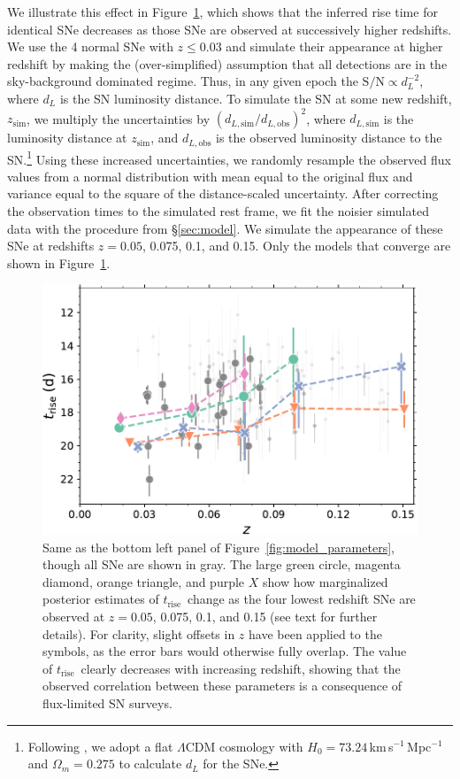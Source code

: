 \documentclass[twocolumn]{./aastex63}
\newcommand{\trise}{$t_\mathrm{rise}$}
\begin{document}
We illustrate this effect in Figure~\ref{fig:high_z_systematic}, which shows
that the inferred rise time for identical SNe decreases as those SNe are
observed at successively higher redshifts. We use the 4 normal SNe with $z \le
0.03$ and simulate their appearance at higher redshift by making the
(over-simplified) assumption that all detections are in the sky-background
dominated regime. Thus, in any given epoch the $\mathrm{S/N} \propto
d_L^{-2}$, where $d_L$ is the SN luminosity distance. To simulate the SN at
some new redshift, $z_\mathrm{sim}$, we multiply the uncertainties by
$(d_{L,\mathrm{sim}}/d_{L,\mathrm{obs}})^2$, where $d_{L,\mathrm{sim}}$ is the
luminosity distance at $z_\mathrm{sim}$, and $d_{L,\mathrm{obs}}$ is the
observed luminosity distance to the SN.\footnote{Following \citet{Yao19}, we
adopt a flat $\Lambda$CDM cosmology with $H_0 =
73.24$\,km\,s$^{-1}$\,Mpc$^{-1}$ \citep{Riess16} and $\Omega_m = 0.275$
\citep{Amanullah10} to calculate $d_L$ for the SNe.} Using these increased
uncertainties, we randomly resample the observed flux values from a normal
distribution with mean equal to the original flux and variance equal to the
square of the distance-scaled uncertainty. After correcting the observation
times to the simulated rest frame, we fit the noisier simulated data with the
procedure from \S\ref{sec:model}. We simulate the appearance of these SNe at
redshifts $z = 0.05$, 0.075, 0.1, and 0.15. Only the models that converge are
shown in Figure~\ref{fig:high_z_systematic}.

\begin{figure}
    \centering
    \includegraphics[width=1\linewidth]{./figures/high_z_systematic.pdf}
    \caption{Same as the bottom left panel of
    Figure~\ref{fig:model_parameters}, though all SNe are shown in gray. The
    large green circle, magenta diamond, orange triangle, and purple $X$ show
    how marginalized posterior estimates of \trise\ change as the four lowest
    redshift SNe are observed at $z = 0.05$, 0.075, 0.1, and 0.15 (see text
    for further details). For clarity, slight offsets in $z$ have been applied
    to the symbols, as the error bars would otherwise fully overlap. The value
    of \trise\ clearly decreases with increasing redshift, showing that the
    observed correlation between these parameters is a consequence of
    flux-limited SN surveys.}
    \label{fig:high_z_systematic}
\end{figure}
\end{document}
